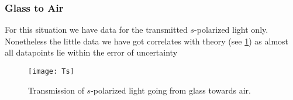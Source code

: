 \subsubsection{Glass to Air}
For this situation we have data for the transmitted $s$-polarized light only. Nonetheless the little data we have got correlates with theory (see \cref{fig:Ts}) as almost all datapoints lie within the error of uncertainty

\begin{figure}[h!]
    \centering
    \texttt{[image: Ts]}
    \caption{Transmission of $s$-polarized light going from glass towards air.}
    \label{fig:Ts}
\end{figure}
